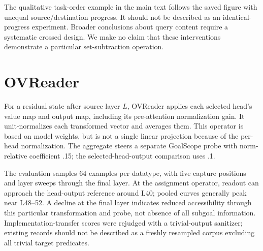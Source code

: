 The qualitative task-order example in the main text follows the saved figure with unequal source/destination progress. It should not be described as an identical-progress experiment. Broader conclusions about query content require a systematic crossed design. We make no claim that these interventions demonstrate a particular set-subtraction operation.

\section{OVReader}
\label{app:ovreader}
For a residual state after source layer $L$, OVReader applies each selected head's value map and output map, including its pre-attention normalization gain. It unit-normalizes each transformed vector and averages them. This operator is based on model weights, but is not a single linear projection because of the per-head normalization. The aggregate steers a separate GoalScope probe with norm-relative coefficient .15; the selected-head-output comparison uses .1.

The evaluation samples 64 examples per datatype, with five capture positions and layer sweeps through the final layer. At the assignment operator, readout can approach the head-output reference around L40; pooled curves generally peak near L48--52. A decline at the final layer indicates reduced accessibility through this particular transformation and probe, not absence of all subgoal information. Implementation-transfer scores were rejudged with a trivial-output sanitizer; existing records should not be described as a freshly resampled corpus excluding all trivial target predicates.

